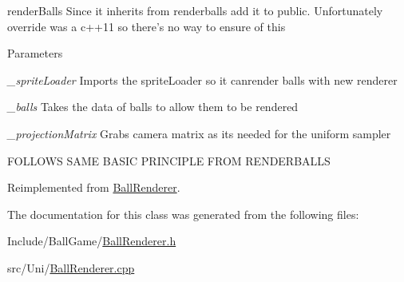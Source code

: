 renderBalls Since it inherits from renderballs add it to public. Unfortunately override was a c++11 so there's no way to ensure of this 
\begin{DoxyParams}{Parameters}
\item[{\em \_\-spriteLoader}]Imports the spriteLoader so it canrender balls with new renderer \item[{\em \_\-balls}]Takes the data of balls to allow them to be rendered \item[{\em \_\-projectionMatrix}]Grabs camera matrix as its needed for the uniform sampler \end{DoxyParams}


FOLLOWS SAME BASIC PRINCIPLE FROM RENDERBALLS 

Reimplemented from \hyperlink{classBallRenderer_a11d6402983ed53ab7f3d3353244110da}{BallRenderer}.

The documentation for this class was generated from the following files:\begin{DoxyCompactItemize}
\item 
Include/BallGame/\hyperlink{BallRenderer_8h}{BallRenderer.h}\item 
src/Uni/\hyperlink{BallRenderer_8cpp}{BallRenderer.cpp}\end{DoxyCompactItemize}

